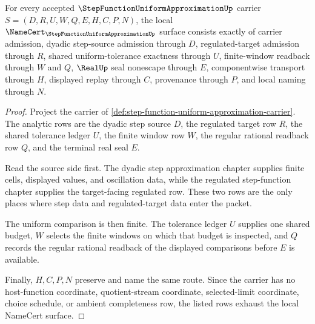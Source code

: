 \begin{theorem}
\label{thm:step-function-uniform-approximation-namecert-obligations}
For every accepted $\StepFunctionUniformApproximationUp$ carrier $S=(D,R,U,W,Q,E,H,C,P,N)$, the local $\NameCert_{\StepFunctionUniformApproximationUp}$ surface consists exactly of carrier admission, dyadic step-source admission through $D$, regulated-target admission through $R$, shared uniform-tolerance exactness through $U$, finite-window readback through $W$ and $Q$, $\RealUp$ seal nonescape through $E$, componentwise transport through $H$, displayed replay through $C$, provenance through $P$, and local naming through $N$.
\end{theorem}
\begin{proof}
Project the carrier of \autoref{def:step-function-uniform-approximation-carrier}. The analytic rows are the dyadic step source $D$, the regulated target row $R$, the shared tolerance ledger $U$, the finite window row $W$, the regular rational readback row $Q$, and the terminal real seal $E$.

Read the source side first. The dyadic step approximation chapter supplies finite cells, displayed values, and oscillation data, while the regulated step-function chapter supplies the target-facing regulated row. These two rows are the only places where step data and regulated-target data enter the packet.

The uniform comparison is then finite. The tolerance ledger $U$ supplies one shared budget, $W$ selects the finite windows on which that budget is inspected, and $Q$ records the regular rational readback of the displayed comparisons before $E$ is available.

Finally, $H,C,P,N$ preserve and name the same route. Since the carrier has no host-function coordinate, quotient-stream coordinate, selected-limit coordinate, choice schedule, or ambient completeness row, the listed rows exhaust the local NameCert surface.
\end{proof}

